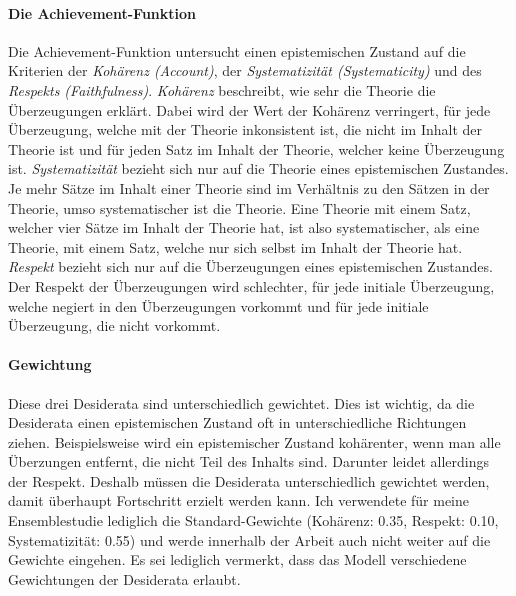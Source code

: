 \documentclass{article}
\begin{document}
\paragraph{Die Achievement-Funktion}
Die Achievement-Funktion untersucht einen epistemischen Zustand auf die Kriterien der \textit{Kohärenz (Account)}, der \textit{Systematizität (Systematicity)} und des \textit{Respekts (Faithfulness)}. \textit{Kohärenz} beschreibt, wie sehr die Theorie die Überzeugungen erklärt. Dabei wird der Wert der Kohärenz verringert, für jede Überzeugung, welche mit der Theorie inkonsistent ist, die nicht im Inhalt der Theorie ist und für jeden Satz im Inhalt der Theorie, welcher keine Überzeugung ist.
\textit{Systematizität} bezieht sich nur auf die Theorie eines epistemischen Zustandes. Je mehr Sätze im Inhalt einer Theorie sind im Verhältnis zu den Sätzen in der Theorie, umso systematischer ist die Theorie. Eine Theorie mit einem Satz, welcher vier Sätze im Inhalt der Theorie hat, ist also systematischer, als eine Theorie, mit einem Satz, welche nur sich selbst im Inhalt der Theorie hat.
\textit{Respekt} bezieht sich nur auf die Überzeugungen eines epistemischen Zustandes. Der Respekt der Überzeugungen wird schlechter, für jede initiale Überzeugung, welche negiert in den Überzeugungen vorkommt und für jede initiale Überzeugung, die nicht vorkommt.

\paragraph{Gewichtung} Diese drei Desiderata sind unterschiedlich gewichtet. Dies ist wichtig, da die Desiderata einen epistemischen Zustand oft in unterschiedliche Richtungen ziehen. Beispielsweise wird ein epistemischer Zustand kohärenter, wenn man alle Überzungen entfernt, die nicht Teil des Inhalts sind. Darunter leidet allerdings der Respekt. Deshalb müssen die Desiderata unterschiedlich gewichtet werden, damit überhaupt Fortschritt erzielt werden kann. Ich verwendete für meine Ensemblestudie lediglich die Standard-Gewichte (Kohärenz: 0.35, Respekt: 0.10, Systematizität: 0.55) und werde innerhalb der Arbeit auch nicht weiter auf die Gewichte eingehen. Es sei lediglich vermerkt, dass das Modell verschiedene Gewichtungen der Desiderata erlaubt. \autocite[S.~9]{beisbart_making_2015}
\end{document}
